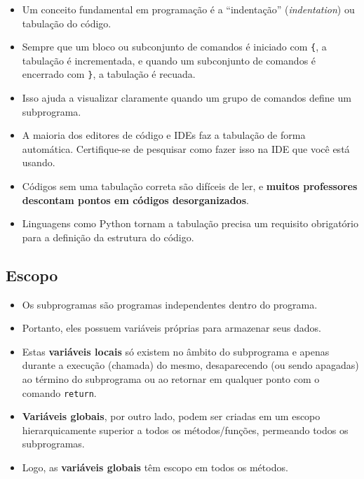 \documentclass[12pt,a4paper]{article}
\providecommand{\tightlist}{%
      \setlength{\itemsep}{0pt}\setlength{\parskip}{0pt}}
\begin{document}
    \begin{itemize}
\item
  Um conceito fundamental em programação é a ``indentação''
  (\emph{indentation}) ou tabulação do código.
\item
  Sempre que um bloco ou subconjunto de comandos é iniciado com
  \texttt{\{}, a tabulação é incrementada, e quando um subconjunto de
  comandos é encerrado com \texttt{\}}, a tabulação é recuada.
\item
  Isso ajuda a visualizar claramente quando um grupo de comandos define
  um subprograma.
\item
  A maioria dos editores de código e IDEs faz a tabulação de forma
  automática. Certifique-se de pesquisar como fazer isso na IDE que você
  está usando.
\item
  Códigos sem uma tabulação correta são difíceis de ler, e
  \textbf{muitos professores descontam pontos em códigos
  desorganizados}.
\end{itemize}

    \begin{itemize}
\tightlist
\item
  Linguagens como Python tornam a tabulação precisa um requisito
  obrigatório para a definição da estrutura do código.
\end{itemize}

    \hypertarget{escopo}{%
\subsection{Escopo}\label{escopo}}

    \begin{itemize}
\tightlist
\item
  Os subprogramas são programas independentes dentro do programa.
\item
  Portanto, eles possuem variáveis próprias para armazenar seus dados.
\item
  Estas \textbf{variáveis locais} só existem no âmbito do subprograma e
  apenas durante a execução (chamada) do mesmo, desaparecendo (ou sendo
  apagadas) ao término do subprograma ou ao retornar em qualquer ponto
  com o comando \texttt{return}.
\item
  \textbf{Variáveis globais}, por outro lado, podem ser criadas em um
  escopo hierarquicamente superior a todos os métodos/funções, permeando
  todos os subprogramas.
\item
  Logo, as \textbf{variáveis globais} têm escopo em todos os métodos.
\end{itemize}
\end{document}
